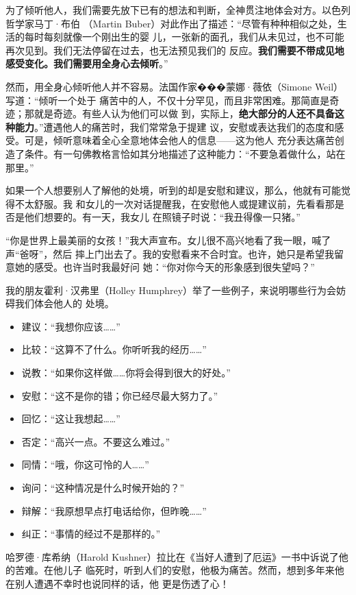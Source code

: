 \documentclass{ctexart}
\begin{document}
为了倾听他人，我们需要先放下已有的想法和判断，全神贯注地体会对方。以色列哲学家马丁·布伯
（Martin Buber）对此作出了描述：``尽管有种种相似之处，生活的每时每刻就像一个刚出生的婴
儿，一张新的面孔，我们从未见过，也不可能再次见到。我们无法停留在过去，也无法预见我们的
反应。\textbf{我们需要不带成见地感受变化。我们需要用全身心去倾听}。''

然而，用全身心倾听他人并不容易。法国作家���蒙娜·薇依（Simone Weil）写道：``倾听一个处于
痛苦中的人，不仅十分罕见，而且非常困难。那简直是奇迹；那就是奇迹。有些人认为他们可以做
到，实际上，\textbf{绝大部分的人还不具备这种能力}。''遭遇他人的痛苦时，我们常常急于提建
议，安慰或表达我们的态度和感受。可是，倾听意味着全心全意地体会他人的信息------这为他人
充分表达痛苦创造了条件。有一句佛教格言恰如其分地描述了这种能力：``不要急着做什么，站在
那里。''

如果一个人想要别人了解他的处境，听到的却是安慰和建议，那么，他就有可能觉得不太舒服。我
和女儿的一次对话提醒我，在安慰他人或提建议前，先看看那是否是他们想要的。有一天，我女儿
在照镜子时说：``我丑得像一只猪。''

``你是世界上最美丽的女孩！''我大声宣布。女儿很不高兴地看了我一眼，喊了声``爸呀''，然后
摔上门出去了。我的安慰看来不合时宜。也许，她只是希望我留意她的感受。也许当时我最好问
她：``你对你今天的形象感到很失望吗？''

我的朋友霍利·汉弗里（Holley Humphrey）举了一些例子，来说明哪些行为会妨碍我们体会他人的
处境。

\begin{itemize}
	\item 建议：``我想你应该\ldots\ldots''
	\item 比较：``这算不了什么。你听听我的经历\ldots\ldots''
	\item 说教：``如果你这样做\ldots\ldots 你将会得到很大的好处。''
	\item 安慰：``这不是你的错；你已经尽最大努力了。''
	\item 回忆：``这让我想起\ldots\ldots''
	\item 否定：``高兴一点。不要这么难过。''
	\item 同情：``哦，你这可怜的人\ldots\ldots''
	\item 询问：``这种情况是什么时候开始的？''
	\item 辩解：``我原想早点打电话给你，但昨晚\ldots\ldots''
	\item 纠正：``事情的经过不是那样的。''
\end{itemize}

哈罗德·库希纳（Harold Kushner）拉比在《当好人遭到了厄运》一书中诉说了他的苦难。在他儿子
临死时，听到人们的安慰，他极为痛苦。然而，想到多年来他在别人遭遇不幸时也说同样的话，他
更是伤透了心！
\end{document}
